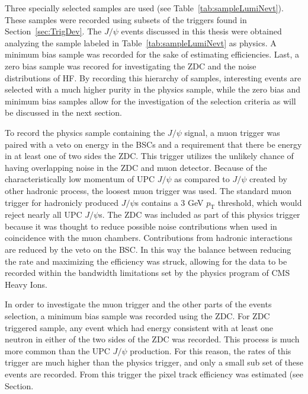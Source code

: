     Three specially selected samples are used (see Table~\ref{tab:sampleLumiNevt}).
    These samples were recorded using subsets of the triggers found in 
      Section~\ref{sec:TrigDev}.
    The $J/\psi$ events discussed in this thesis were obtained analyzing the 
    sample labeled in Table~\ref{tab:sampleLumiNevt} as physics.
    A minimum bias sample was recorded for the sake of estimating efficiencies.
    Last, a zero bias sample was recored for investigating the ZDC and the 
      noise distributions of HF.
    By recording this hierarchy of samples, interesting events are selected 
      with a much higher purity in the physics sample, while the zero bias and 
      minimum bias samples allow for the investigation of the selection 
      criteria as will be discussed in the next section. 

    To record the physics sample containing the $J/\psi$ signal, a muon trigger
      was paired with a veto on energy in the BSCs and a requirement that there 
      be energy in at least one of two sides the ZDC. 
    This trigger utilizes the unlikely chance of having overlapping noise
      in the ZDC and muon detector.
    Because of the characteristically low momentum of UPC $J/\psi$ as compared
      to $J/\psi$ created by other hadronic process, the loosest muon 
      trigger was used.
    The standard muon trigger for hadronicly produced $J/\psi$s contains a 3 
      GeV $p_{\mathrm{T}}$ threshold, which would reject nearly all UPC 
      $J/\psi$s.
    The ZDC was included as part of this physics trigger because it was thought
      to reduce possible noise contributions when used in coincidence with 
      the muon chambers. 
    Contributions from hadronic interactions are reduced by the veto on the 
      BSC.
    In this way the balance between reducing the rate and maximizing the 
      efficiency was struck, allowing for the data to be recorded within 
      the bandwidth limitations set by the physics program of CMS Heavy Ions.
    
    In order to investigate the muon trigger and the other parts of the events 
      selection, a minimum bias sample was recorded using the ZDC. 
    For ZDC triggered sample, any event which had energy consistent with at 
      least one neutron in either of the two sides of the ZDC was recorded.
    This process is much more common than the UPC $J/\psi$ production.
    For this reason, the rates of this trigger are much higher than the physics
      trigger, and only a small sub set of these events are recorded.
    From this trigger the pixel track efficiency was estimated (see 
      Section. 

